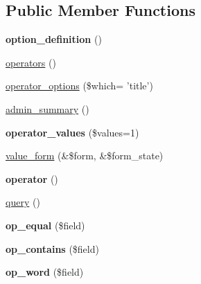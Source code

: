 \subsection*{Public Member Functions}
\begin{DoxyCompactItemize}
\item 
\hypertarget{classviews__handler__filter__string_a12b7ca0453039900efde58e2c14bf0c8}{
{\bfseries option\_\-definition} ()}
\label{classviews__handler__filter__string_a12b7ca0453039900efde58e2c14bf0c8}

\item 
\hyperlink{classviews__handler__filter__string_adb301581372054e2f66faab09e47004e}{operators} ()
\item 
\hyperlink{classviews__handler__filter__string_a9b6d71fc1698780860f2ec9ff84f2b46}{operator\_\-options} (\$which= 'title')
\item 
\hyperlink{classviews__handler__filter__string_a3152b0f2ce38cf493327e2a91b9c9f5e}{admin\_\-summary} ()
\item 
\hypertarget{classviews__handler__filter__string_abd9ab34d0c4ba349e90af3b31207e203}{
{\bfseries operator\_\-values} (\$values=1)}
\label{classviews__handler__filter__string_abd9ab34d0c4ba349e90af3b31207e203}

\item 
\hyperlink{classviews__handler__filter__string_a41c2ed02d24685d046eccd9e751ad916}{value\_\-form} (\&\$form, \&\$form\_\-state)
\item 
\hypertarget{classviews__handler__filter__string_af7c1de50414bf4682426feacde048feb}{
{\bfseries operator} ()}
\label{classviews__handler__filter__string_af7c1de50414bf4682426feacde048feb}

\item 
\hyperlink{classviews__handler__filter__string_afcfdae379583a2eb912e1b82d4513503}{query} ()
\item 
\hypertarget{classviews__handler__filter__string_adafc69b6a86f3753489e04915919116c}{
{\bfseries op\_\-equal} (\$field)}
\label{classviews__handler__filter__string_adafc69b6a86f3753489e04915919116c}

\item 
\hypertarget{classviews__handler__filter__string_a400991d6aaff1bc44d314a9a71a7ea8c}{
{\bfseries op\_\-contains} (\$field)}
\label{classviews__handler__filter__string_a400991d6aaff1bc44d314a9a71a7ea8c}

\item 
\hypertarget{classviews__handler__filter__string_a6f770c7146a74977d642bfa8f28446cc}{
{\bfseries op\_\-word} (\$field)}
\label{classviews__handler__filter__string_a6f770c7146a74977d642bfa8f28446cc}


\end{DoxyCompactItemize}
